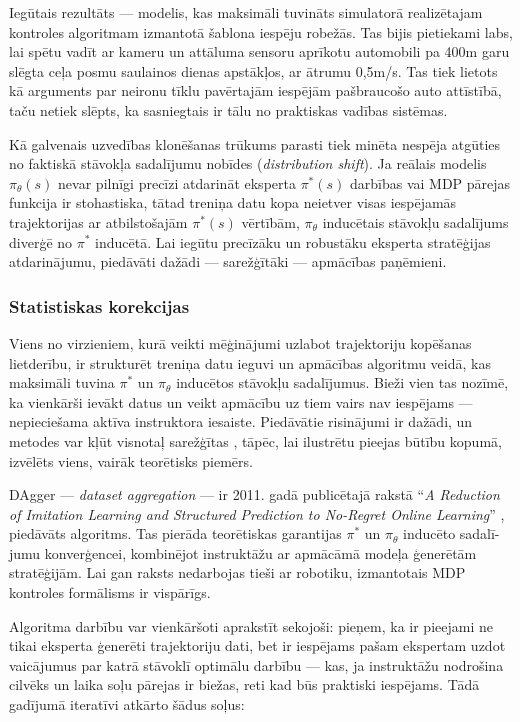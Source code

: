 \documentclass[12pt, a4paper]{article}
\numberwithin{equation}{section} %
\begin{document}
Iegūtais rezultāts --- modelis, kas maksimāli tuvināts simulatorā realizētajam kontroles algoritmam izmantotā šablona iespēju robežās. Tas bijis pietiekami labs, lai spētu vadīt ar kameru un attāluma sensoru aprīkotu automobili pa 400m garu slēgta ceļa posmu saulainos dienas apstākļos, ar ātrumu 0,5m/s. Tas tiek lietots kā arguments par neironu tīklu pavērtajām iespējām pašbraucošo auto attīstībā, taču netiek slēpts, ka sasniegtais ir tālu no praktiskas vadības sistēmas.

Kā galvenais uzvedības klonēšanas trūkums parasti tiek minēta nespēja atgūties no faktiskā stāvokļa sadalījumu nobīdes \cite{attia2018global} (\textit{distribution shift}). Ja reālais modelis $\pi_{\theta}(s)$ nevar pilnīgi precīzi atdarināt eksperta $\pi^*(s)$ darbības vai MDP pārejas funkcija ir stohastiska, tātad treniņa datu kopa neietver visas iespējamās trajektorijas ar atbilstošajām $\pi^*(s)$ vērtībām, $\pi_{\theta}$ inducētais stāvokļu sadalījums diverģē no $\pi^*$ inducētā. Lai iegūtu precīzāku un robustāku eksperta stratēģijas atdarinājumu, piedāvāti dažādi --- sarežģītāki --- apmācības paņēmieni.


\subsubsection{Statistiskas korekcijas}

Viens no virzieniem, kurā veikti mēģinājumi uzlabot trajektoriju kopēšanas lietderību, ir strukturēt treniņa datu ieguvi un apmācības algoritmu veidā, kas maksimāli tuvina $\pi^*$ un $\pi_{\theta}$ inducētos stāvokļu sadalījumus. Bieži vien tas nozīmē, ka vienkārši ievākt datus un veikt apmācību uz tiem vairs nav iespējams --- nepieciešama aktīva instruktora iesaiste. Piedāvātie risinājumi ir dažādi, un metodes var kļūt visnotaļ sarežģītas \cite{attia2018global}, tāpēc, lai ilustrētu pieejas būtību kopumā, izvēlēts viens, vairāk teorētisks piemērs.

DAgger --- \textit{dataset aggregation} --- ir 2011. gadā publicētajā rakstā ``\textit{A Reduction of Imitation Learning and Structured Prediction
to No-Regret Online Learning}'' \cite{ross2011no}, piedāvāts algoritms. Tas pierāda teorētiskas garantijas $\pi^*$ un $\pi_{\theta}$ inducēto sadalī-jumu konverģencei, kombinējot instruktāžu ar apmācāmā modeļa ģenerētām stratēģijām. Lai gan raksts nedarbojas tieši ar robotiku, izmantotais MDP kontroles formālisms ir vispārīgs.

Algoritma darbību var vienkāršoti aprakstīt sekojoši: pieņem, ka ir pieejami ne tikai eksperta ģenerēti trajektoriju dati, bet ir iespējams pašam ekspertam uzdot vaicājumus par katrā stāvoklī optimālu darbību --- kas, ja instruktāžu nodrošina cilvēks un laika soļu pārejas ir biežas, reti kad būs praktiski iespējams. Tādā gadījumā iteratīvi atkārto šādus soļus:
\end{document}
